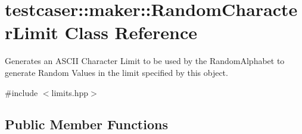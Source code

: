 \hypertarget{classtestcaser_1_1maker_1_1RandomCharacterLimit}{}\section{testcaser\+:\+:maker\+:\+:Random\+Character\+Limit Class Reference}
\label{classtestcaser_1_1maker_1_1RandomCharacterLimit}


Generates an A\+S\+C\+II Character Limit to be used by the Random\+Alphabet to generate Random Values in the limit specified by this object.  




{\ttfamily \#include $<$limits.\+hpp$>$}

\subsection*{Public Member Functions}
